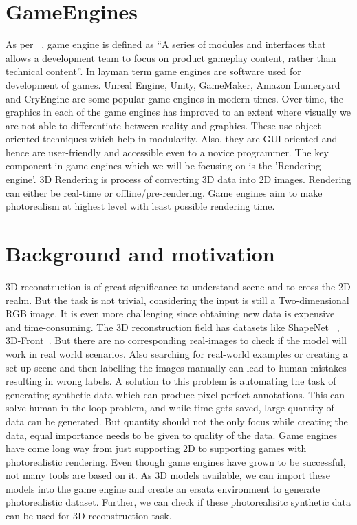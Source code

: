 \section{GameEngines}\label{sec:gameengines}
As per ~\cite{10.5555/983334}, game engine is defined as “A series of modules and interfaces that allows a
development team to focus on product gameplay content, rather than technical content”.
In layman term game engines are software used for development of games.
Unreal Engine, Unity, GameMaker, Amazon Lumeryard and CryEngine are some popular game engines in modern times.
Over time, the graphics in each of the game engines has improved to an extent where visually we are not able to differentiate between reality and graphics.
These use object-oriented techniques which help in modularity.
Also, they are GUI-oriented and hence are user-friendly and accessible even to a novice programmer.
The key component in game engines which we will be focusing on is the 'Rendering engine'.
3D Rendering is process of converting 3D data into 2D images.
Rendering can either be real-time or offline/pre-rendering.
Game engines aim to make photorealism at highest level with least possible rendering time.


\section{Background and motivation}\label{sec:Background and motivation}
3D reconstruction is of great significance to understand scene and to cross the 2D realm.
But the task is not trivial, considering the input is still a Two-dimensional RGB image.
It is even more challenging since obtaining new data is expensive and time-consuming.
The 3D reconstruction field has datasets like ShapeNet ~\cite{chang2015shapenet}, 3D-Front~\cite{Fu20203DFRONT3F}.
But there are no corresponding real-images to check if the model will work in real world scenarios.
Also searching for real-world examples or creating a set-up scene and then labelling the images manually can lead to human mistakes resulting in wrong labels.
A solution to this problem is automating the task of generating synthetic data which can produce pixel-perfect annotations.
This can solve human-in-the-loop problem, and while time gets saved, large quantity of data can be generated.
But quantity should not the only focus while creating the data, equal importance needs to be given to quality of the data.
Game engines have come long way from just supporting 2D to supporting games with photorealistic rendering.
Even though game engines have grown to be successful, not many tools are based on it.
As 3D models available, we can import these models into the game engine and create an ersatz environment to generate photorealistic dataset.
Further, we can check if these photorealisitc synthetic data can be used for 3D reconstruction task.

